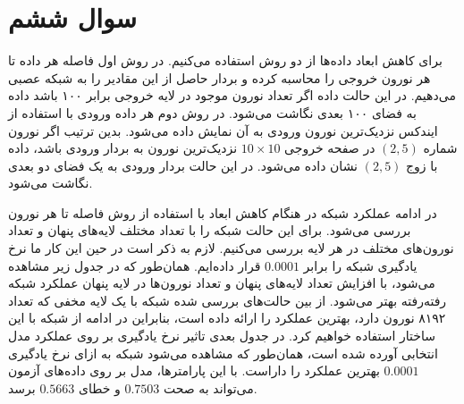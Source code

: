 \documentclass[12pt, a4paper]{article}
\begin{document}
\clearpage

\section*{سوال ششم}

برای کاهش ابعاد داده‌ها از دو روش استفاده می‌کنیم. در روش اول فاصله هر داده تا هر نورون خروجی را محاسبه کرده
و بردار حاصل از این مقادیر را به شبکه عصبی می‌دهیم. در این حالت داده اگر تعداد نورون موجود در لایه خروجی
برابر ۱۰۰ باشد داده به فضای ۱۰۰ بعدی نگاشت می‌شود. در روش دوم هر داده ورودی با استفاده از ایندکس نزدیک‌ترین نورون
ورودی به آن نمایش داده می‌شود. بدین ترتیب اگر نورون شماره $(2,5)$ در صفحه خروجی $10 \times 10$ نزدیک‌ترین نورون
به بردار ورودی باشد، داده با زوج $(2,5)$ نشان داده می‌شود. در این حالت بردار ورودی به یک فضای دو بعدی نگاشت می‌شود.

در ادامه عملکرد شبکه در هنگام کاهش ابعاد با استفاده از روش فاصله تا هر نورون بررسی می‌شود.
برای این حالت شبکه را با تعداد مختلف لایه‌های پنهان و تعداد نورون‌های مختلف در هر لایه بررسی می‌کنیم.
لازم به ذکر است در حین این کار ما نرخ یادگیری شبکه را برابر $0.0001$ قرار داده‌ایم.
همان‌طور که در جدول زیر مشاهده می‌شود، با افزایش تعداد لایه‌های پنهان و تعداد نورون‌ها در لایه پنهان عملکرد شبکه
رفته‌رفته بهتر می‌شود. از بین حالت‌های بررسی شده شبکه با یک لایه مخفی که تعداد ۸۱۹۲ نورون دارد،
بهترین عملکرد را ارائه داده است، بنابراین در ادامه از شبکه با این ساختار استفاده خواهیم کرد.
در جدول بعدی تاثیر نرخ یادگیری بر روی عملکرد مدل انتخابی آورده شده است، همان‌طور که مشاهده می‌شود
شبکه به ازای نرخ یادگیری $0.0001$ بهترین عملکرد را داراست. با این پارامتر‌ها، مدل بر روی داده‌های آزمون
می‌تواند به صحت $0.7503$ و خطای $0.5663$ برسد.
\end{document}
